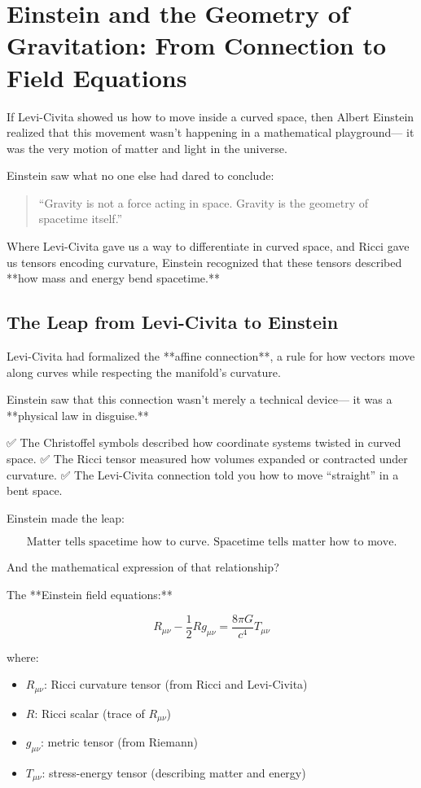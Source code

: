 \section{Einstein and the Geometry of Gravitation: From Connection to Field Equations}

If Levi-Civita showed us how to move inside a curved space,  
then Albert Einstein realized that this movement wasn’t happening in a mathematical playground—  
it was the very motion of matter and light in the universe.

Einstein saw what no one else had dared to conclude:

\begin{quote}
“Gravity is not a force acting in space.  
Gravity is the geometry of spacetime itself.”  
\end{quote}

Where Levi-Civita gave us a way to differentiate in curved space,  
and Ricci gave us tensors encoding curvature,  
Einstein recognized that these tensors described **how mass and energy bend spacetime.**

\bigskip

\subsection*{The Leap from Levi-Civita to Einstein}

Levi-Civita had formalized the **affine connection**, a rule for how vectors move along curves while respecting the manifold’s curvature.

Einstein saw that this connection wasn’t merely a technical device—  
it was a **physical law in disguise.**

✅ The Christoffel symbols described how coordinate systems twisted in curved space.  
✅ The Ricci tensor measured how volumes expanded or contracted under curvature.  
✅ The Levi-Civita connection told you how to move “straight” in a bent space.

Einstein made the leap:

\[
\boxed{\text{Matter tells spacetime how to curve. Spacetime tells matter how to move.}}
\]

And the mathematical expression of that relationship?

The **Einstein field equations:**

\[
R_{\mu\nu} - \frac{1}{2} R g_{\mu\nu} = \frac{8\pi G}{c^4} T_{\mu\nu}
\]

where:

\begin{itemize}
  \item \( R_{\mu\nu} \): Ricci curvature tensor (from Ricci and Levi-Civita)
  \item \( R \): Ricci scalar (trace of \( R_{\mu\nu} \))
  \item \( g_{\mu\nu} \): metric tensor (from Riemann)
  \item \( T_{\mu\nu} \): stress-energy tensor (describing matter and energy)
\end{itemize}

